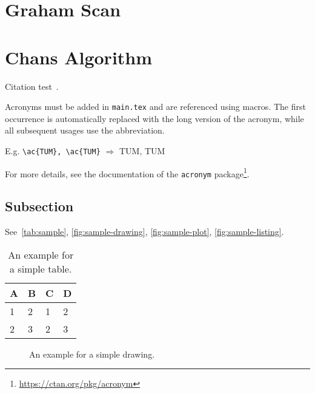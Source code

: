\section{Graham Scan}

\section{Chans Algorithm}


Citation test~\parencite{latex}.

Acronyms must be added in \texttt{main.tex} and are referenced using macros. The first occurrence is automatically replaced with the long version of the acronym, while all subsequent usages use the abbreviation.

E.g. \texttt{\textbackslash ac\{TUM\}, \textbackslash ac\{TUM\}} $\Rightarrow$ \ac{TUM}, \ac{TUM}

For more details, see the documentation of the \texttt{acronym} package\footnote{\url{https://ctan.org/pkg/acronym}}.
\subsection{Subsection}

See~\autoref{tab:sample}, \autoref{fig:sample-drawing}, \autoref{fig:sample-plot}, \autoref{fig:sample-listing}.

\begin{table}[htpb]
  \caption[Example table]{An example for a simple table.}\label{tab:sample}
  \centering
  \begin{tabular}{l l l l}
    \toprule
      A & B & C & D \\
    \midrule
      1 & 2 & 1 & 2 \\
      2 & 3 & 2 & 3 \\
    \bottomrule
  \end{tabular}
\end{table}

\begin{figure}[htpb]
  \centering
  \caption[Example drawing]{An example for a simple drawing.}\label{fig:sample-drawing}
\end{figure}

